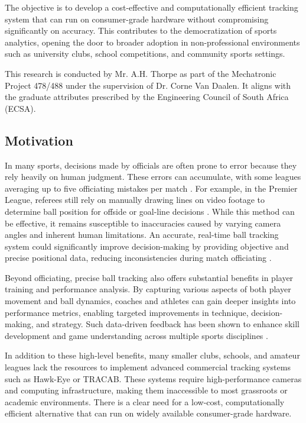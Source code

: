 \documentclass[12pt,a4paper]{article}
\begin{document}
The objective is to develop a cost-effective and computationally efficient tracking system that can run on consumer-grade hardware without compromising significantly on accuracy. This contributes to the democratization of sports analytics, opening the door to broader adoption in non-professional environments such as university clubs, school competitions, and community sports settings.

This research is conducted by Mr. A.H. Thorpe as part of the Mechatronic Project 478/488 under the supervision of Dr. Corne Van Daalen. It aligns with the graduate attributes prescribed by the Engineering Council of South Africa (ECSA).

\subsection{Motivation}
In many sports, decisions made by officials are often prone to error because they rely heavily on human judgment. These errors can accumulate, with some leagues averaging up to five officiating mistakes per match \parencite{ref_officiating_error}. For example, in the Premier League, referees still rely on manually drawing lines on video footage to determine ball position for offside or goal-line decisions \parencite{premier_league_offside}. While this method can be effective, it remains susceptible to inaccuracies caused by varying camera angles and inherent human limitations. An accurate, real-time ball tracking system could significantly improve decision-making by providing objective and precise positional data, reducing inconsistencies during match officiating \parencite{hawk_eye_system}.

Beyond officiating, precise ball tracking also offers substantial benefits in player training and performance analysis. By capturing various aspects of both player movement and ball dynamics, coaches and athletes can gain deeper insights into performance metrics, enabling targeted improvements in technique, decision-making, and strategy. Such data-driven feedback has been shown to enhance skill development and game understanding across multiple sports disciplines \parencite{tracking_training_benefits}.

In addition to these high-level benefits, many smaller clubs, schools, and amateur leagues lack the resources to implement advanced commercial tracking systems such as Hawk-Eye or TRACAB. These systems require high-performance cameras and computing infrastructure, making them inaccessible to most grassroots or academic environments. There is a clear need for a low-cost, computationally efficient alternative that can run on widely available consumer-grade hardware.
\end{document}
